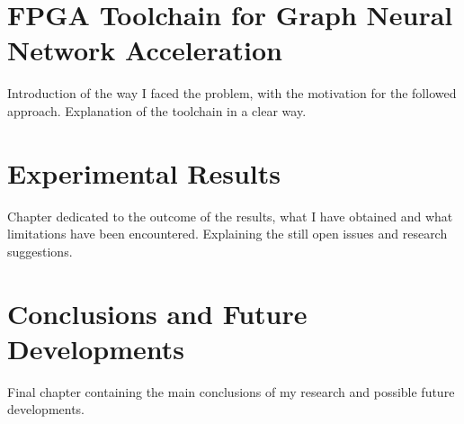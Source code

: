 \documentclass{Configuration_Files/PoliMi3i_thesis}
\begin{document}


    \chapter{FPGA Toolchain for Graph Neural Network Acceleration}
    \label{ch:chapter_five}%

    Introduction of the way I faced the problem, with the motivation for the followed approach.
    Explanation of the toolchain in a clear way.



    \chapter{Experimental Results}
    \label{ch:chapter_six}%

    Chapter dedicated to the outcome of the results, what I have obtained and what limitations have been encountered.
    Explaining the still open issues and research suggestions.




    \chapter{Conclusions and Future Developments}
    \label{ch:conclusions}%
    Final chapter containing the main conclusions of my research
    and possible future developments.



\end{document}
